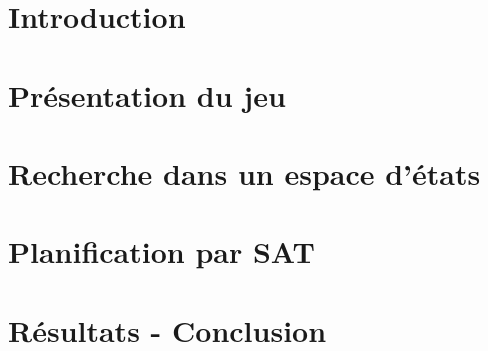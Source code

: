 \section*{Introduction}

\section{Présentation du jeu}
\section{Recherche dans un espace d'états}
\section{Planification par SAT}

\section*{Résultats - Conclusion}